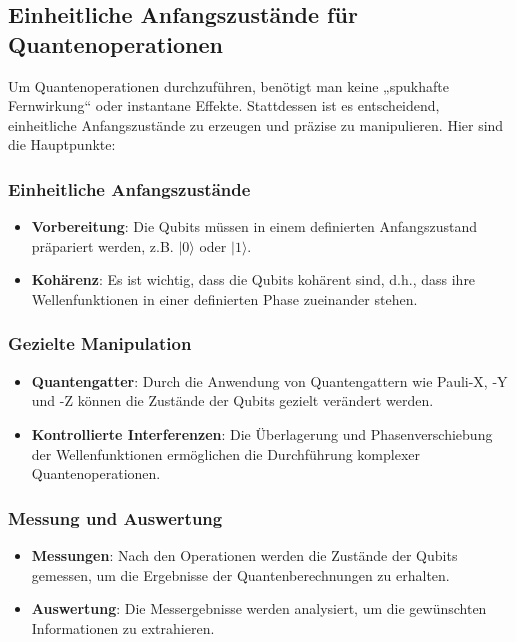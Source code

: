 \documentclass[12pt,a4paper]{article}
\begin{document}
	
	
	\subsection{Einheitliche Anfangszustände für Quantenoperationen}
	
	Um Quantenoperationen durchzuführen, benötigt man keine „spukhafte Fernwirkung“ oder instantane Effekte. Stattdessen ist es entscheidend, einheitliche Anfangszustände zu erzeugen und präzise zu manipulieren. Hier sind die Hauptpunkte:
	
	\subsubsection{Einheitliche Anfangszustände}
	\begin{itemize}
		\item \textbf{Vorbereitung}: Die Qubits müssen in einem definierten Anfangszustand präpariert werden, z.B. \(|0\rangle\) oder \(|1\rangle\).
		\item \textbf{Kohärenz}: Es ist wichtig, dass die Qubits kohärent sind, d.h., dass ihre Wellenfunktionen in einer definierten Phase zueinander stehen.
	\end{itemize}
	
	\subsubsection{Gezielte Manipulation}
	\begin{itemize}
		\item \textbf{Quantengatter}: Durch die Anwendung von Quantengattern wie Pauli-X, -Y und -Z können die Zustände der Qubits gezielt verändert werden.
		\item \textbf{Kontrollierte Interferenzen}: Die Überlagerung und Phasenverschiebung der Wellenfunktionen ermöglichen die Durchführung komplexer Quantenoperationen.
	\end{itemize}
	
	\subsubsection{Messung und Auswertung}
	\begin{itemize}
		\item \textbf{Messungen}: Nach den Operationen werden die Zustände der Qubits gemessen, um die Ergebnisse der Quantenberechnungen zu erhalten.
		\item \textbf{Auswertung}: Die Messergebnisse werden analysiert, um die gewünschten Informationen zu extrahieren.
	\end{itemize}
	
\end{document}
